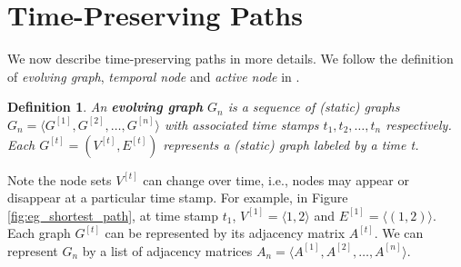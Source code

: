 \documentclass[12pt]{article}
\newtheorem{definition}{Definition}
\theoremstyle{definition}
\begin{document}






\section{Time-Preserving Paths}
\label{sec:time-pres-paths}

We now describe time-preserving paths in more details. We follow the definition of
\emph{evolving graph}, \emph{temporal node} and \emph{active node} in \cite{chen16}.

\begin{definition}
  An \textbf{evolving graph} $G_n$ is a sequence of (static) graphs 
$G_n = \langle G^{[1]}, G^{[2]},  \ldots ,G^{[n]} \rangle$ with associated time stamps
$t_1, t_2, \ldots, t_n$ respectively. Each $G^{[t]} = (V^{[t]}, E^{[t]})$ represents a (static) graph labeled by a time t.
\end{definition}

Note the node sets $V^{[t]}$ can change over time, i.e., nodes may appear or disappear at a particular time stamp.
For example, in Figure \ref{fig:eg_shortest_path}, at time stamp $t_1$, $V^{[1]} = \langle 1, 2 \rangle$ and $E^{[1]} = \langle (1,2) \rangle$. Each graph $G^{[t]}$ can be represented by its adjacency matrix $A^{[t]}$. 
We can represent $G_n$ by a list of adjacency matrices $A_n = \langle A^{[1]}, A^{[2]}, \ldots, A^{[n]} \rangle$.
\end{document}
